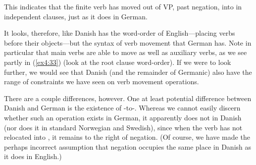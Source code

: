 \begin{exe}
	\ex \label{ex4:34} 
	\begin{xlist}
	\end{xlist}
\end{exe}
This indicates that the finite verb has moved out of VP, past negation, into  in independent clauses, just as it does in German.

It looks, therefore, like Danish has the word-order of English---placing verbs before their objects---but the syntax of verb movement that German has. Note in particular that main verbs are able to move as well as auxiliary verbs, as we see partly in (\ref{ex4:33}) (look at the root clause word-order). If we were to look further, we would see that Danish (and the remainder of Germanic) also have the range of constraints we have seen on verb movement operations.

There are a couple differences, however. One at least potential difference between Danish and German is the existence of -to-. Whereas we cannot easily discern whether such an operation exists in German, it apparently does not in Danish (nor does it in standard Norwegian and Swedish), since when the verb has not relocated into , it remains to the right of negation. (Of course, we have made the perhaps incorrect assumption that negation occupies the same place in Danish as it does in English.)

